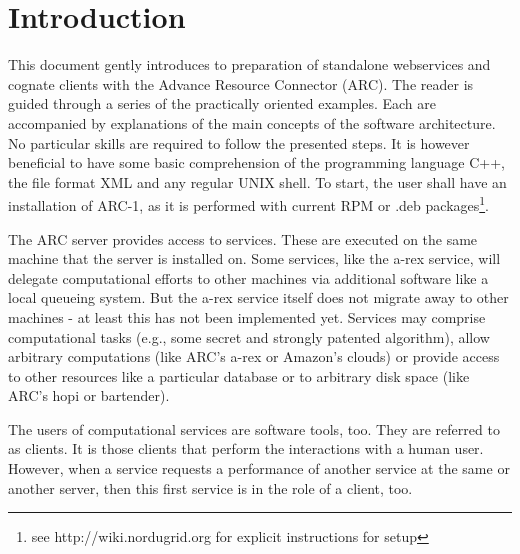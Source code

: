 
\chapter{Introduction}

This document gently introduces to preparation of standalone webservices and cognate clients with the Advance Resource Connector (ARC).
The reader is guided through a series of the practically oriented examples.
Each are accompanied by explanations of the main concepts of the software architecture.
No particular skills are required to follow the presented steps.
It is however beneficial to have some basic comprehension of the programming language C++, the file format XML and any regular UNIX shell.
To start, the user shall have an installation of ARC-1, as it is performed with current RPM or .deb packages\footnote{see http://wiki.nordugrid.org for explicit instructions for setup}.


The ARC server provides access to services.
These are executed on the same machine that the server is installed on.
Some services, like the a-rex service, will delegate computational efforts to other machines
via additional software like a local queueing system.
But the a-rex service itself does not migrate away to other machines - at least this
has not been implemented yet.
Services may comprise computational tasks (e.g., some secret and strongly
patented algorithm), allow arbitrary computations (like ARC's a-rex or
Amazon's clouds) or provide access to other resources like a particular
database or to arbitrary disk space (like ARC's hopi or bartender).


The users of computational services are software tools, too.
They are referred to as clients.
It is those clients that perform the interactions with a human user.
However, when a service requests a performance of another service at the same or another server, then this first service is in the role of a client, too.



